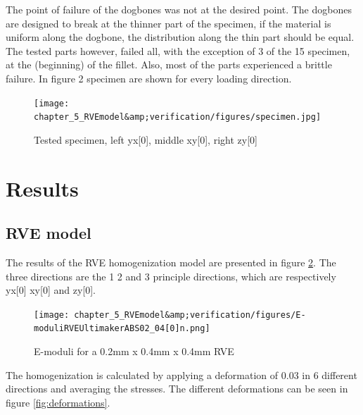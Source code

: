 The point of failure of the dogbones was not at the desired point. The dogbones are designed to break at the thinner part of the specimen, if the material is uniform along the dogbone, the distribution along the thin part should be equal. The tested parts however, failed all, with the exception of 3 of the 15 specimen, at the (beginning) of the fillet. Also, most of the parts experienced a brittle failure. In figure 2 specimen are shown for every loading direction.

\begin{figure}[H]
    \centering
    \texttt{[image: chapter\_5\_RVEmodel\&amp;verification/figures/specimen.jpg]}
    \caption{Tested specimen, left yx[0], middle xy[0], right zy[0]}
    \label{fig:specimen}
\end{figure}
 \pagebreak[4]


\section{Results}
\subsection{RVE model}
The results of the RVE homogenization model are presented in figure \ref{fig:RVEresults}. The three directions are the 1 2 and 3 principle directions, which are respectively yx[0] xy[0] and zy[0].

\begin{figure}[H]
    \centering
    \texttt{[image: chapter\_5\_RVEmodel\&amp;verification/figures/E-moduliRVEUltimakerABS02\_04[0]n.png]}
    \caption{E-moduli for a 0.2mm x 0.4mm x 0.4mm RVE}
    \label{fig:RVEresults}
\end{figure}

The homogenization is calculated by applying a deformation of 0.03 in 6 different directions and averaging the stresses. The different deformations can be seen in figure \ref{fig:deformations}.

